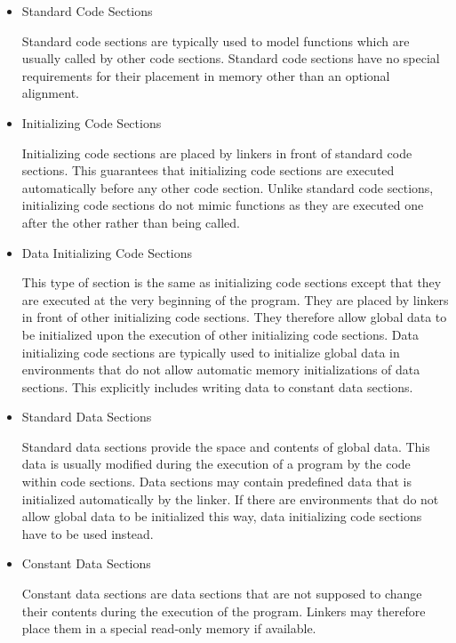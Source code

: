 \begin{itemize}

\item Standard Code Sections\alignright{}\nopagebreak

Standard code sections are typically used to model functions which are usually called by other code sections.
Standard code sections have no special requirements for their placement in memory other than an optional alignment.

\item Initializing Code Sections\alignright{}\nopagebreak

Initializing code sections are placed by linkers in front of standard code sections.
This guarantees that initializing code sections are executed automatically before any other code section.
Unlike standard code sections, initializing code sections do not mimic functions as they are executed one after the other rather than being called.

\item Data Initializing Code Sections\alignright{}\nopagebreak

This type of section is the same as initializing code sections except that they are executed at the very beginning of the program.
They are placed by linkers in front of other initializing code sections.
They therefore allow global data to be initialized upon the execution of other initializing code sections.
Data initializing code sections are typically used to initialize global data in environments that do not allow automatic memory initializations of data sections.
This explicitly includes writing data to constant data sections.

\item Standard Data Sections\alignright{}\nopagebreak

Standard data sections provide the space and contents of global data.
This data is usually modified during the execution of a program by the code within code sections.
Data sections may contain predefined data that is initialized automatically by the linker.
If there are environments that do not allow global data to be initialized this way, data initializing code sections have to be used instead.

\item Constant Data Sections\alignright{}\nopagebreak

Constant data sections are data sections that are not supposed to change their contents during the execution of the program.
Linkers may therefore place them in a special read-only memory if available.


\end{itemize}

